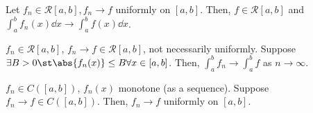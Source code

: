 \begin{theorem}
    Let $f_n \in \mathcal{R}[a, b], f_n \to f$ uniformly on $[a, b]$. Then, $f \in \mathcal{R}[a, b]$ and $\int_a^b f_n(x) \dd{x} \to \int_a^b f(x) \dd{x}$.
\end{theorem}

\begin{theorem}
    $f_n \in \mathcal{R}[a, b]$, $f_n \to f \in \mathcal{R}[a, b]$, not necessarily uniformly. Suppose $\exists B > 0 \st \abs{f_n(x)} \leq B \forall x \in [a, b]$. Then, $\int_a^b f_n \to \int_a^b f$ as $n \to \infty$.
\end{theorem}

\begin{theorem}
    $f_n \in C([a, b])$, $f_n(x)$ monotone (as a sequence). Suppose $f_n \to f \in C([a, b])$. Then, $f_n \to f$ uniformly on $[a, b]$.
\end{theorem}